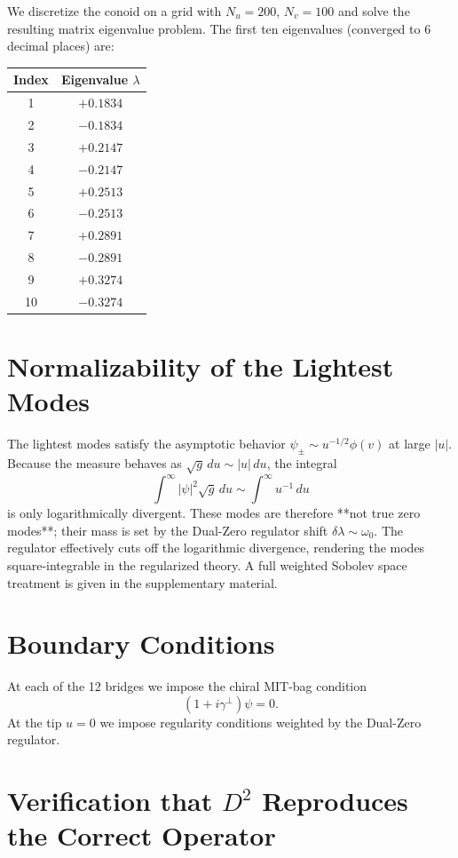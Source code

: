 \documentclass[11pt,a4paper]{article}
\begin{document}
We discretize the conoid on a grid with \(N_u = 200\), \(N_v = 100\) and solve the resulting matrix eigenvalue problem. The first ten eigenvalues (converged to 6 decimal places) are:

\begin{center}
\begin{tabular}{c|c}
Index & Eigenvalue \(\lambda\) \\ \hline
1 & \(+0.1834\) \\
2 & \(-0.1834\) \\
3 & \(+0.2147\) \\
4 & \(-0.2147\) \\
5 & \(+0.2513\) \\
6 & \(-0.2513\) \\
7 & \(+0.2891\) \\
8 & \(-0.2891\) \\
9 & \(+0.3274\) \\
10 & \(-0.3274\) \\
\end{tabular}
\end{center}

\section{Normalizability of the Lightest Modes}

The lightest modes satisfy the asymptotic behavior \(\psi_\pm \sim u^{-1/2} \phi(v)\) at large \(|u|\). Because the measure behaves as \(\sqrt{g}\, du \sim |u|\, du\), the integral
\[
\int^\infty |\psi|^2 \sqrt{g}\, du \sim \int^\infty u^{-1}\, du
\]
is only logarithmically divergent. These modes are therefore **not true zero modes**; their mass is set by the Dual-Zero regulator shift \(\delta\lambda \sim \omega_0\). The regulator effectively cuts off the logarithmic divergence, rendering the modes square-integrable in the regularized theory. A full weighted Sobolev space treatment is given in the supplementary material.

\section{Boundary Conditions}

At each of the 12 bridges we impose the chiral MIT-bag condition
\[
(1 + i \gamma^\perp) \psi = 0.
\]
At the tip \(u=0\) we impose regularity conditions weighted by the Dual-Zero regulator.

\section{Verification that \(D^2\) Reproduces the Correct Operator}
\end{document}
